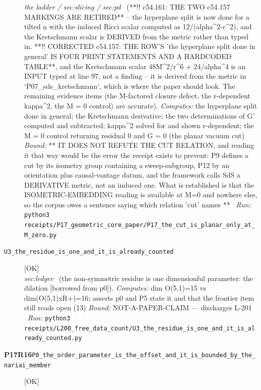 \begin{description}
\textit{the ladder / sec:slicing / sec:pd} \ (**!! c54.161: THE TWO c54.157 MARKINGS ARE RETIRED** -- the hyperplane split is now done for a tilted n with the induced Ricci scalar computed as 12/(alpha\textasciicircum{}2-c\textasciicircum{}2), and the Kretschmann scalar is DERIVED from the metric rather than typed in. **!! CORRECTED c54.157: THE ROW'S 'the hyperplane split done in general' IS FOUR PRINT STATEMENTS AND A HARDCODED TABLE**, and the Kretschmann scalar 48M\textasciicircum{}2/r\textasciicircum{}6 + 24/alpha\textasciicircum{}4 is an INPUT typed at line 97, not a finding -- it is derived from the metric in `P07\_sds\_kretschmann`, which is where the paper should look. The remaining evidence items (the M-factored closure defect, the r-dependent kappa\textasciicircum{}2, the M = 0 control) are accurate). 
\emph{Computes:} the hyperplane split done in general; the Kretschmann derivative; the two determinations of G' computed and subtracted; kappa\textasciicircum{}2 solved for and shown r-dependent; the M = 0 control returning residual 0 and G = 0 (the planar vacuum cut)
 \emph{Bound:} ** IT DOES NOT REFUTE THE CUT RELATION, and reading it that way would be the error the receipt exists to prevent: P9 defines a cut by its isometry group containing a sweep-subgroup, P12 by an orientation plus causal-vantage datum, and the framework calls SdS a DERIVATIVE metric, not an induced one. What is established is that the ISOMETRIC-EMBEDDING reading is available at M=0 and nowhere else, so the corpus owes a sentence saying which relation 'cut' names **
\ \emph{Run:} \texttt{python3 receipts/P17\_geometric\_core\_paper/P17\_the\_cut\_is\_planar\_only\_at\_M\_zero.py}
\item[\label{rcpt:U3_the_residue_is_one_and_it_is_already_counted}\textbf{}\quad\texttt{U3\_the\_residue\_is\_one\_and\_it\_is\_already\_counted}]\hfill\textsf{[OK]}\\
\textit{sec:ledger} \ (the non-symmetric residue is one dimensionful parameter: the dilation [borrowed from p0]). 
\emph{Computes:} dim O(5,1)=15 vs dim(O(5,1)xR+)=16; asserts p0 and P5 state it and that the frontier item still reads open (13)
 \emph{Bound:} NOT-A-PAPER-CLAIM --- discharges L-201
\ \emph{Run:} \texttt{python3 receipts/L200\_free\_data\_count/U3\_the\_residue\_is\_one\_and\_it\_is\_already\_counted.py}
\item[\rcptlabel{P0_the_order_parameter_is_the_offset_and_it_is_bounded_by_the_nariai_member}{P17R16}\textbf{P17R16}\quad\texttt{P0\_the\_order\_parameter\_is\_the\_offset\_and\_it\_is\_bounded\_by\_the\_nariai\_member}]\hfill\textsf{[OK]}\\

\end{description}

